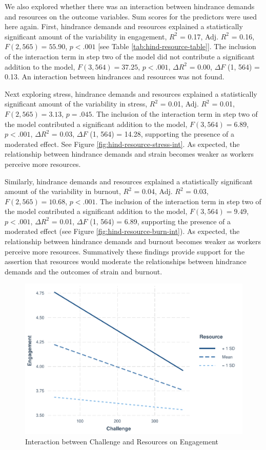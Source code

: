 \documentclass[
  man]{apa7}
\begin{document}
We also explored whether there was an interaction between hindrance demands and resources on the outcome variables. Sum scores for the predictors were used here again. First, hindrance demands and resources explained a statistically significant amount of the variability in engagement, \(R^2\) = 0.17, Adj. \(R^2\) = 0.16, \(F(2, 565) = 55.90\), \(p < .001\) {[}see Table \ref{tab:hind-resource-table}{]}. The inclusion of the interaction term in step two of the model did not contribute a significant addition to the model, \(F(3, 564) = 37.25\), \(p < .001\), \(\Delta R^2\) = 0.00, \(\Delta F\) (1, 564) = 0.13. An interaction between hindrances and resources was not found.

Next exploring stress, hindrance demands and resources explained a statistically significant amount of the variability in stress, \(R^2\) = 0.01, Adj. \(R^2\) = 0.01, \(F(2, 565) = 3.13\), \(p = .045\). The inclusion of the interaction term in step two of the model contributed a significant addition to the model, \(F(3, 564) = 6.89\), \(p < .001\), \(\Delta R^2\) = 0.03, \(\Delta F\) (1, 564) = 14.28, supporting the presence of a moderated effect. See Figure \ref{fig:hind-resource-stress-int}. As expected, the relationship between hindrance demands and strain becomes weaker as workers perceive more resources.

Similarly, hindrance demands and resources explained a statistically significant amount of the variability in burnout, \(R^2\) = 0.04, Adj. \(R^2\) = 0.03, \(F(2, 565) = 10.68\), \(p < .001\). The inclusion of the interaction term in step two of the model contributed a significant addition to the model, \(F(3, 564) = 9.49\), \(p < .001\), \(\Delta R^2\) = 0.01, \(\Delta F\) (1, 564) = 6.89, supporting the presence of a moderated effect (see Figure \ref{fig:hind-resource-burn-int}). As expected, the relationship between hindrance demands and burnout becomes weaker as workers perceive more resources. Summatively these findings provide support for the assertion that resources would moderate the relationships between hindrance demands and the outcomes of strain and burnout.

\begin{figure}
\centering
\includegraphics{Submission_files/figure-latex/chal-resource-int-1.pdf}
\caption{\label{fig:chal-resource-int}Interaction between Challenge and Resources on Engagement}
\end{figure}
\end{document}
